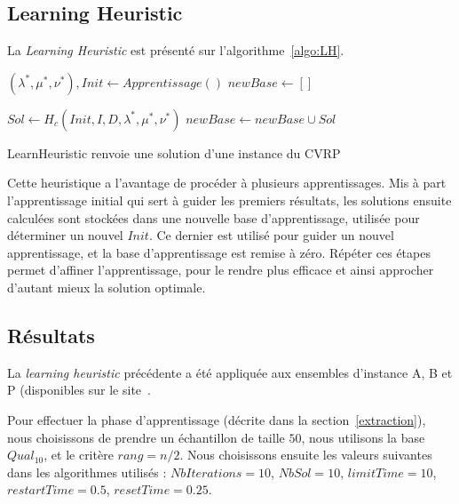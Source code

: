 \documentclass[a4paper,11pt]{article}%
\begin{document}
\subsection{Learning Heuristic}
La \emph{Learning Heuristic} est présenté sur l'algorithme~\ref{algo:LH}.

\begin{algorithm}
\DontPrintSemicolon %
$(\lambda^*,\mu^*,\nu^*), Init \gets Apprentissage()$\;
$newBase \gets []$\;
 {
	 {
		
		 {
			$Sol \gets H_c(Init,I,D,\lambda^*,\mu^*,\nu^*)$\;
			$newBase \gets newBase \cup Sol$\;
			}	
		
	}
}
\;
\caption{{\sc LearnHeuristic} renvoie une solution d'une instance du CVRP}
\label{algo:LH}
\end{algorithm}

Cette heuristique a l'avantage de procéder à plusieurs apprentissages. 
Mis à part l'apprentissage initial qui sert à guider les premiers résultats, les solutions ensuite calculées sont stockées dans une nouvelle base d'apprentissage, utilisée pour déterminer un nouvel $Init$.
Ce dernier est utilisé pour guider un nouvel apprentissage, et la base d'apprentissage est remise à zéro. 
Répéter ces étapes permet d'affiner l'apprentissage, pour le rendre plus efficace et ainsi approcher d'autant mieux la solution optimale.


\subsection{Résultats}

La \emph{learning heuristic} précédente a été appliquée aux ensembles d'instance A, B et P (disponibles sur le site~\cite{cvrplib}.

Pour effectuer la phase d'apprentissage (décrite dans la section~\ref{extraction}), nous choisissons de prendre un échantillon de taille $50$, nous utilisons la base $Qual_{10}$, et le critère $ rang = n/2$. Nous choisissons ensuite les valeurs suivantes dans les algorithmes utilisés : $ NbIterations = 10$, $NbSol = 10$, $limitTime = 10$, $restartTime = 0.5$, $resetTime = 0.25$.
\end{document}
